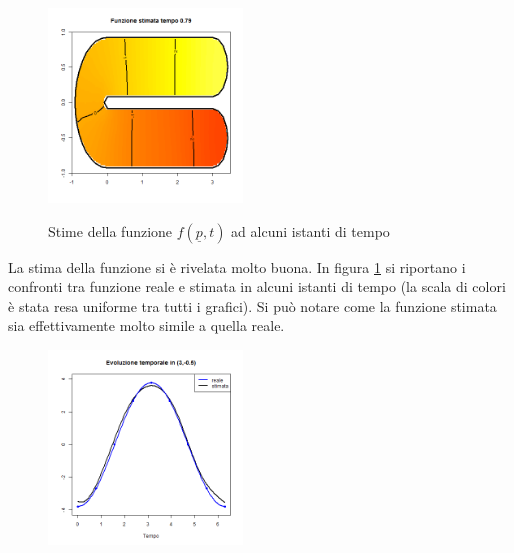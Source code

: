 \documentclass[a4paper,11pt,twoside,openright]{book}							%
\begin{document}
\begin{figure}[t]
   {
	\includegraphics[width=0.46\textwidth]{Immagini/DomC_pi4stimata.png}
   }
\caption{Stime della funzione $f(\underline p,t)$ ad alcuni istanti di tempo}
\label{fig:DomC_ris}
\end{figure}

La stima della funzione si è rivelata molto buona. In figura \ref{fig:DomC_ris} si riportano i confronti tra funzione reale e stimata in alcuni istanti di tempo (la scala di colori è stata resa uniforme tra tutti i grafici). Si può notare come la funzione stimata sia effettivamente molto simile a quella reale. 

\begin{figure}[t]
\centering
\includegraphics[width=0.46\textwidth]{Immagini/DomC_tfissato.png}   
\label{fig:DomC_ris2}
\end{figure}
\end{document}
